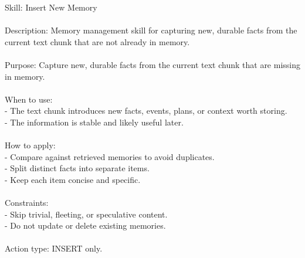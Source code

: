 \begin{center}
\begin{tcolorbox}[title={Initial Primitive Skill - INSERT}]
{
Skill: Insert New Memory \\\\
Description: Memory management skill for capturing new, durable facts from the current text chunk that are not already in memory. \\\\
Purpose: Capture new, durable facts from the current text chunk that are missing in memory. \\\\
When to use: \\
- The text chunk introduces new facts, events, plans, or context worth storing. \\
- The information is stable and likely useful later. \\\\
How to apply: \\
- Compare against retrieved memories to avoid duplicates. \\
- Split distinct facts into separate items. \\
- Keep each item concise and specific. \\\\
Constraints: \\
- Skip trivial, fleeting, or speculative content. \\
- Do not update or delete existing memories. \\\\
Action type: INSERT only.
}
\label{appendix:case_insert}
\end{tcolorbox}
\end{center}



